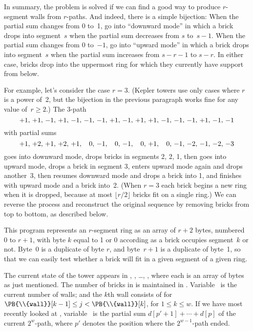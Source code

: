 In summary, the problem is solved if we can find a good way to produce
$r$-segment walls from $r$-paths. And indeed, there is a simple
bijection: When the partial sum changes from 0 to~1, go into ``downward
mode'' in which a brick drops into segment~$s$ when the partial
sum decreases from $s$ to~$s-1$. When the partial sum changes from
0 to~$-1$, go into ``upward mode'' in which a brick drops into segment~$s$
when the partial sum increases from $s-r-1$ to $s-r$. In either case,
bricks drop into the uppermost ring for which they currently
have support from below.

For example, let's consider the case $r=3$. (Kepler towers use only
cases where $r$ is a power of~2, but the bijection in the previous
paragraph works fine for any value of~$r\ge2$.) The 3-path
$$\thinmuskip=6mu
+1,+1,-1,+1,-1,-1,-1,+1,-1,+1,+1,-1,-1,-1,+1,-1,-1$$
with partial sums
$$\thinmuskip=6mu \def~{\phantom{{+}}}
+1,+2,+1,+2,+1,~0,-1,~0,-1,~0,+1,~0,-1,-2,-1,-2,-3$$
goes into downward mode, drops bricks in segments 2, 2, 1, then goes
into upward mode, drops a brick in segment 3, enters upward mode
again and drops another~3, then resumes downward mode
and drops a brick into 1, and finishes with upward mode and a brick
into~2. (When $r=3$ each brick begins a new ring when it is dropped,
because at most $\lfloor r/2\rfloor$ bricks fit on a single ring.)
We can reverse the process and reconstruct the original sequence
by removing bricks from top to bottom, as described below.

\fi

This program represents an $r$-segment ring as an array of $r+2$
bytes, numbered 0 to $r+1$, with byte $k$ equal to 1 or 0
according as a brick occupies segment~$k$ or not.
Byte~0 is a duplicate of byte $r$, and byte~$r+1$
is a duplicate of byte~1, so that we can easily test whether a
brick will fit in a given segment of a given ring.

The current state of the tower appears in , , \dots,
, where each  is an array of bytes as just
mentioned.
The number of bricks in  is maintained in .
Variable~ is the current number of walls; and
the $k$th wall consists of  for $\PB{\\{wall}}[k-1]\le j<\PB{%
\\{wall}}[k]$,
for $1\le k\le w$.
If we have most recently looked at , variable~ is the
partial
sum $d[p'+1]+\cdots+d[p]$ of the current $2^w$-path, where $p'$ denotes
the position where the $2^{w-1}$-path ended.

